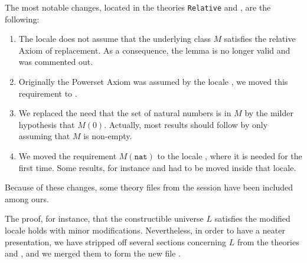 The most notable changes, located in the theories \texttt{Relative}
and , are
the following:
\begin{enumerate}
\item\label{item:1} The locale 
  does not assume that the underlying class $M$ satisfies the relative
  Axiom of replacement.  As a consequence, the lemma
   is no longer valid and was commented
  out.
\item\label{item:2}  Originally the Powerset Axiom was assumed by the
  locale ,   we moved this requirement to . 
\item\label{item:3} We replaced the need that the set of natural
  numbers is in $M$ by the   milder hypothesis that $M(0)$. Actually,
  most results should follow 
  by only assuming that $M$ is non-empty.
\item We moved the requirement $M(\mathtt{nat})$ to the locale
  , where it is needed for the first time. Some results,
  for instance  and 
   had to be moved inside that
  locale. 
\end{enumerate}
Because of these changes, some theory files from the
 session have been included among ours.

The proof, for instance, that the constructible universe $L$ satisfies
the modified locale  holds with minor
modifications. Nevertheless, in order to have a neater presentation,
we have stripped off several sections concerning $L$ from the theories
 and , and we merged them to form
the new file  . 

